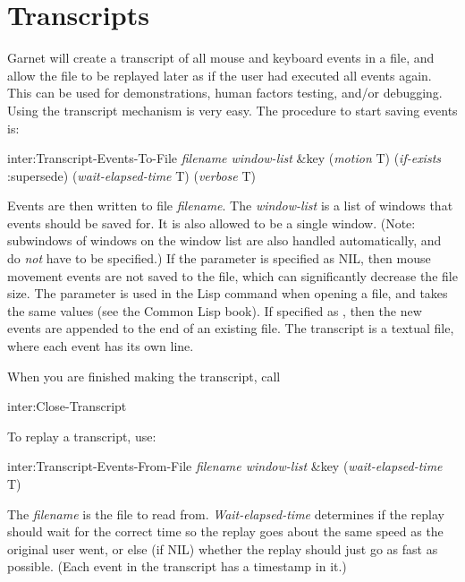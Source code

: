 \chapter{Transcripts}
\label{transcripts-sec}

Garnet will create a transcript of all mouse and keyboard events in a file, and
allow the file to be replayed later as if the user had executed
all events again.  This can be used for demonstrations, human factors testing,
and/or debugging.  Using the transcript mechanism is very easy.  The
procedure to start saving events is:
\begin{programexample}
inter:Transcript-Events-To-File {\it filename  window-list}\value{function}
				\&key ({\it motion} T) ({\it if-exists} :supersede)
                                     ({\it wait-elapsed-time} T) ({\it verbose} T)
\end{programexample}
Events are then written to file {\it filename}.  The {\it window-list} is a
list of windows that events should be saved for.  It is also allowed to be
a single window.  (Note: subwindows of windows on the window list are also
handled automatically, and do {\it not} have to be specified.)
If the  parameter is specified as NIL, then
mouse movement events are not saved to the file, which can significantly
decrease the file size.  The  parameter is used in the Lisp
 command when opening a file, and takes the same values (see
the Common Lisp book).  If specified as , then the new events
are appended to the end of an existing file.  The transcript is a textual
file, where each event has its own line.

When you are finished making the transcript, call
\begin{programexample}
inter:Close-Transcript\value{function}
\end{programexample}

To replay a transcript, use:
\begin{programexample}
inter:Transcript-Events-From-File {\it filename window-list} \&key ({\it wait-elapsed-time} T)\value{function}
\end{programexample}
The {\it filename} is the file to read from.  {\it Wait-elapsed-time}
determines if the replay should wait for the correct time so the replay
goes about the same speed as the original user went, or else (if NIL)
whether the replay should just go as fast as possible.  (Each event in the
transcript has a timestamp in it.)

